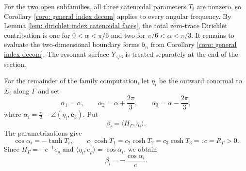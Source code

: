 \documentclass[11pt,twoside]{amsart}
\numberwithin{equation}{section}
\begin{document}
For the two open subfamilies, all three catenoidal parameters $T_i$ are nonzero, so Corollary \ref{coro: general index decom} applies to every angular frequency. By Lemma \ref{lem: dirichlet index catenoidal faces}, the total zero-trace Dirichlet contribution is one for $0<\alpha<\pi/6$ and two for $\pi/6<\alpha<\pi/3$. It remains to evaluate the two-dimensional boundary forms $\mathfrak b_n$ from Corollary \ref{coro: general index decom}. The resonant surface $Y_{\pi/6}$ is treated separately at the end of the section.
\medskip





For the remainder of the family computation, let $\eta_i$ be the outward conormal to $\Sigma_i$ along $\Gamma$ and set
\[
\alpha_1=\alpha,\qquad
\alpha_2=\alpha+\frac{2\pi}{3},\qquad
\alpha_3=\alpha-\frac{2\pi}{3},
\]
where $\alpha_i=\frac{\pi}{2}-\angle(\eta_i,\mathbf e_3)$. Put
\[
\beta_i=\langle H_{\Gamma},\eta_i\rangle.
\]
The parametrizations give
\[
\cos\alpha_i=-\tanh T_i,
\qquad
c_1\cosh T_1=c_2\cosh T_2=c_3\cosh T_3=:c=R_\Gamma>0.
\]
Since $H_\Gamma=-c^{-1}e_\rho$ and $\langle\eta_i,e_\rho\rangle=\cos\alpha_i$, we obtain
\[
\beta_i=-\frac{\cos\alpha_i}{c}.
\]
\end{document}
